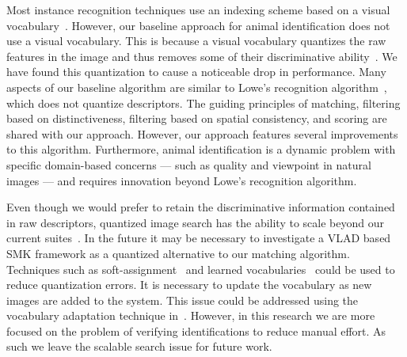         Most instance recognition techniques use an indexing scheme based on a visual
        vocabulary~\cite{tolias_image_2015, jegou_hamming_2008, philbin_object_2007, cao_learning_2012,
        arandjelovic_all_2013, jegou_negative_2012, chum_fast_2012, gong_multiscale_2014}. However, our baseline
        approach for animal identification does not use a visual vocabulary. This is because a visual vocabulary
        quantizes the raw features in the image and thus removes some of their discriminative
        ability~\cite{philbin_lost_2008, boiman_defense_2008}. We have found this quantization to cause a noticeable
        drop in performance.
        Many aspects of our baseline algorithm are similar to Lowe's recognition algorithm~\cite{lowe_distinctive_2004},
        which does not quantize descriptors. The guiding principles of matching, filtering based on distinctiveness,
        filtering based on spatial consistency, and scoring are shared with our approach. However, our approach features
        several improvements to this algorithm. Furthermore, animal identification is a dynamic problem with specific
        domain-based concerns --- such as quality and viewpoint in natural images --- and requires innovation beyond
        Lowe's recognition algorithm.

        Even though we would prefer to retain the discriminative information contained in raw descriptors, quantized
        image search has the ability to scale beyond our current suites~\cite{chum_fast_2012,
        perronnin_largescale_2010-1, tolias_image_2015}.
        In the future it may be necessary to investigate a VLAD based SMK framework as a quantized alternative to our
        matching algorithm. Techniques such as soft-assignment~\cite{philbin_lost_2008} and learned
        vocabularies~\cite{mikulik_learning_2010} could be used to reduce quantization errors. It is necessary to update
        the vocabulary as new images are added to the system. This issue could be addressed using the vocabulary
        adaptation technique in~\cite{arandjelovic_all_2013}. However, in this research we are more focused on the
        problem of verifying identifications to reduce manual effort. As such we leave the scalable search issue for
        future work.

